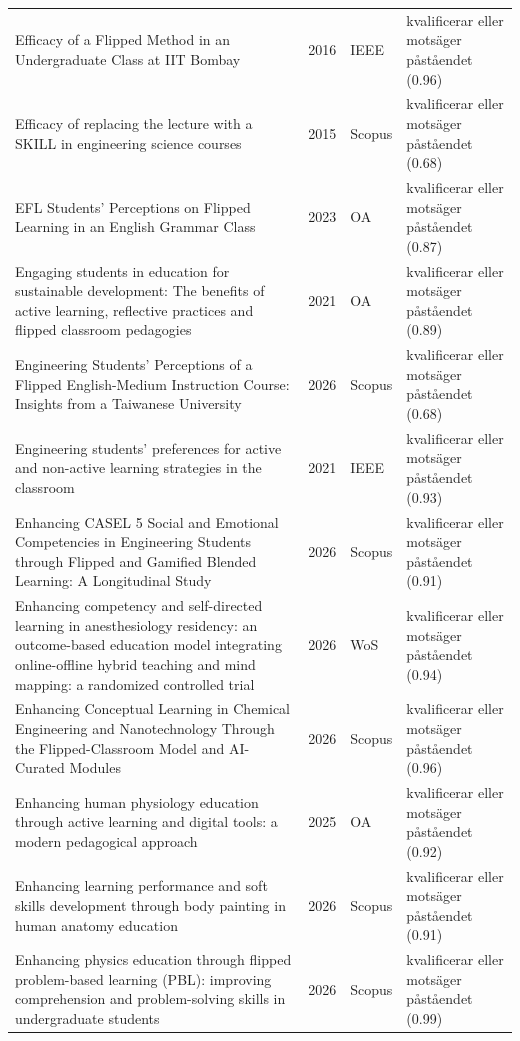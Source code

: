 \begin{longtable}{@{}%
  >{\raggedright\arraybackslash}p{}c%
  >{\raggedright\arraybackslash}p{}%
  >{\raggedright\arraybackslash}p{}@{}}
Efficacy of a Flipped Method in an Undergraduate Class at IIT Bombay & 2016 & IEEE & kvalificerar eller motsäger påståendet (0.96) \\
Efficacy of replacing the lecture with a SKILL in engineering science courses & 2015 & Scopus & kvalificerar eller motsäger påståendet (0.68) \\
EFL Students' Perceptions on Flipped Learning in an English Grammar Class & 2023 & OA & kvalificerar eller motsäger påståendet (0.87) \\
Engaging students in education for sustainable development: The benefits of active learning, reflective practices and flipped classroom pedagogies & 2021 & OA & kvalificerar eller motsäger påståendet (0.89) \\
Engineering Students' Perceptions of a Flipped English-Medium Instruction Course: Insights from a Taiwanese University & 2026 & Scopus & kvalificerar eller motsäger påståendet (0.68) \\
Engineering students' preferences for active and non-active learning strategies in the classroom & 2021 & IEEE & kvalificerar eller motsäger påståendet (0.93) \\
Enhancing CASEL 5 Social and Emotional Competencies in Engineering Students through Flipped and Gamified Blended Learning: A Longitudinal Study & 2026 & Scopus & kvalificerar eller motsäger påståendet (0.91) \\
Enhancing competency and self-directed learning in anesthesiology residency: an outcome-based education model integrating online-offline hybrid teaching and mind mapping: a randomized controlled trial & 2026 & WoS & kvalificerar eller motsäger påståendet (0.94) \\
Enhancing Conceptual Learning in Chemical Engineering and Nanotechnology Through the Flipped-Classroom Model and AI-Curated Modules & 2026 & Scopus & kvalificerar eller motsäger påståendet (0.96) \\
Enhancing human physiology education through active learning and digital tools: a modern pedagogical approach & 2025 & OA & kvalificerar eller motsäger påståendet (0.92) \\
Enhancing learning performance and soft skills development through body painting in human anatomy education & 2026 & Scopus & kvalificerar eller motsäger påståendet (0.91) \\
Enhancing physics education through flipped problem-based learning (PBL): improving comprehension and problem-solving skills in undergraduate students & 2026 & Scopus & kvalificerar eller motsäger påståendet (0.99) \\

\end{longtable}
